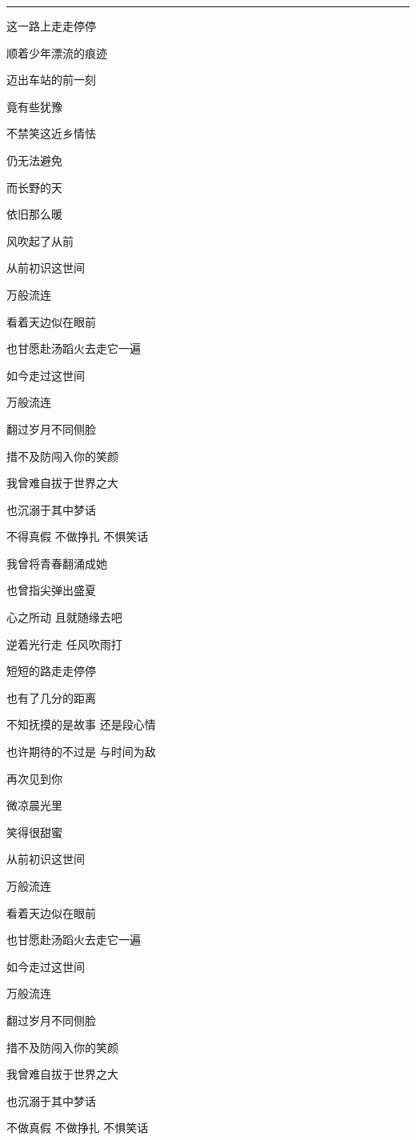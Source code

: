 \documentclass[]{ctexbook}
\begin{document}
\begin{center}\rule{0.5\linewidth}{0.5pt}\end{center}

这一路上走走停停

顺着少年漂流的痕迹

迈出车站的前一刻

竟有些犹豫

不禁笑这近乡情怯

仍无法避免

而长野的天

依旧那么暖

风吹起了从前

从前初识这世间

万般流连

看着天边似在眼前

也甘愿赴汤蹈火去走它一遍

如今走过这世间

万般流连

翻过岁月不同侧脸

措不及防闯入你的笑颜

我曾难自拔于世界之大

也沉溺于其中梦话

不得真假 不做挣扎 不惧笑话

我曾将青春翻涌成她

也曾指尖弹出盛夏

心之所动 且就随缘去吧

逆着光行走 任风吹雨打

短短的路走走停停

也有了几分的距离

不知抚摸的是故事 还是段心情

也许期待的不过是 与时间为敌

再次见到你

微凉晨光里

笑得很甜蜜

从前初识这世间

万般流连

看着天边似在眼前

也甘愿赴汤蹈火去走它一遍

如今走过这世间

万般流连

翻过岁月不同侧脸

措不及防闯入你的笑颜

我曾难自拔于世界之大

也沉溺于其中梦话

不做真假 不做挣扎 不惧笑话
\end{document}
